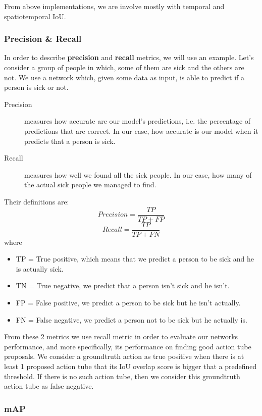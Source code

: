 \begin{description}
\begin{enumerate}
\end{enumerate}
\end{description}
From above implementations, we are involve mostly with temporal and spatiotemporal IoU.

\subsubsection{Precision  \& Recall }

In order to describe \textbf{precision} and \textbf{recall} metrics, we will use an example. Let's consider a group of people in which, some of them are sick and
the others are not. We use a network which, given some data as input, is able to predict if a person is sick or not.
\begin{description}
\item[ Precision ]  measures how accurate are our model's predictions, i.e. the percentage of  predictions that are correct.
  In our case, how accurate is our model when it predicts that a person is sick.
\item[ Recall ] measures how well we found all the sick people. In our case, how many of the actual sick people we managed to find.
\end{description}
Their definitions are:
\[ Precision = \frac{TP}{TP + FP} \]  
\[  Recall = \frac{TP}{TP + FN} \] 
where \begin{itemize}
\item TP = True positive, which means that we predict a person to be sick and he is actually sick.
\item TN = True negative, we predict that a person isn't sick and he isn't.
\item FP = False positive, we predict a person to be sick but he isn't actually.
\item FN = False negative, we predict a person not to be sick but he actually is.
\end{itemize}

From these 2 metrics we use recall metric in order to evaluate our networks performance, and more specifically, its performance on finding good action tube proposals.
We consider a groundtruth action as true positive when there is at least 1 proposed action tube that its IoU overlap score is bigger that
a predefined threshold. If there is no such action tube, then we consider this groundtruth action tube as false negative.


\subsubsection{mAP }

